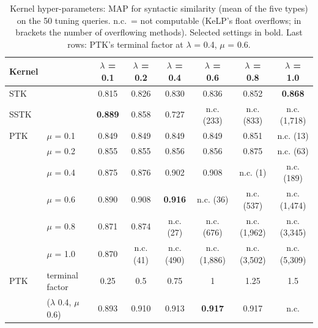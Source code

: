 \begin{table}[!htbp]
\centering
\caption{Kernel hyper-parameters: MAP for syntactic similarity (mean of the five types) on the 50 tuning queries. n.c.\ = not computable (KeLP's float overflows; in brackets the number of overflowing methods). Selected settings in bold. Last rows: PTK's terminal factor at $\lambda$ = 0.4, $\mu$ = 0.6.}
\label{tab:sensitivity}
\footnotesize
\setlength{\tabcolsep}{3pt}
\begin{tabular}{llcccccc}
\toprule
Kernel & & $\lambda$ = 0.1 & $\lambda$ = 0.2 & $\lambda$ = 0.4 & $\lambda$ = 0.6 & $\lambda$ = 0.8 & $\lambda$ = 1.0 \\
\midrule
STK & & 0.815 & 0.826 & 0.830 & 0.836 & 0.852 & \textbf{0.868} \\
SSTK & & \textbf{0.889} & 0.858 & 0.727 & n.c. (233) & n.c. (833) & n.c. (1,718) \\
\midrule
PTK & $\mu$ = 0.1 & 0.849 & 0.849 & 0.849 & 0.849 & 0.851 & n.c. (13) \\
 & $\mu$ = 0.2 & 0.855 & 0.855 & 0.856 & 0.856 & 0.875 & n.c. (63) \\
 & $\mu$ = 0.4 & 0.875 & 0.876 & 0.902 & 0.908 & n.c. (1) & n.c. (189) \\
 & $\mu$ = 0.6 & 0.890 & 0.908 & \textbf{0.916} & n.c. (36) & n.c. (537) & n.c. (1,474) \\
 & $\mu$ = 0.8 & 0.871 & 0.874 & n.c. (27) & n.c. (676) & n.c. (1,962) & n.c. (3,345) \\
 & $\mu$ = 1.0 & 0.870 & n.c. (41) & n.c. (490) & n.c. (1,886) & n.c. (3,502) & n.c. (5,309) \\
\midrule
PTK & terminal factor & 0.25 & 0.5 & 0.75 & 1 & 1.25 & 1.5 \\
 & ($\lambda$ 0.4, $\mu$ 0.6) & 0.893 & 0.910 & 0.913 & \textbf{0.917} & 0.917 & n.c. \\
\bottomrule
\end{tabular}
\end{table}
